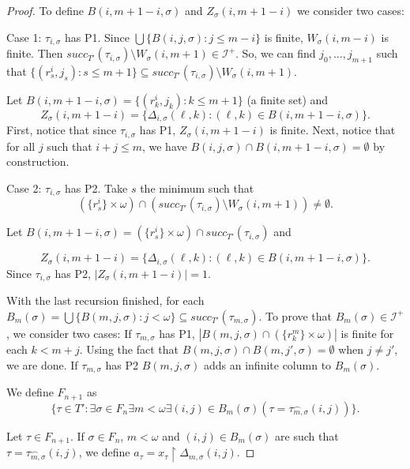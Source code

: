 \documentclass{amsart}
\theoremstyle{definition}
\theoremstyle{remark}
\numberwithin{equation}{section}
\newcommand{\id}{\mathcal{I}}
\newcommand{\restr}[2]{#1\upharpoonright {#2}}
\begin{document}
\begin{proof}
    To define $B(i,m+1-i,\sigma)$ and $ Z_\sigma(i,m+1-i)$ we consider two cases:

    Case 1: $\tau_{i,\sigma}$ has P1. Since $\bigcup\{B(i,j,\sigma):j\leq m-i\}$ is finite, $W_\sigma(i,m-i)$ is finite. Then $succ_{T'}(\tau_{i,\sigma})\setminus W_\sigma(i,m+1)\in\id^+ $. So, we can find $j_0,...,j_{m+1}$ such that $\{(r_s^i,j_s): s\leq m+1\}\subseteq succ_{T'}(\tau_{i,\sigma})\setminus W_\sigma(i,m+1)$. 
    
    Let $B(i,m+1-i,\sigma)=\{(r^i_k,j_k):k\leq m+1\}$ (a finite set) and 
    \[ Z_\sigma(i,m+1-i)=\{ \Delta_{i,\sigma}(\ell,k): (\ell,k)\in B(i,m+1-i,\sigma)\}.
    \]
    First, notice that since $\tau_{i,\sigma}$ has P1, $Z_\sigma(i,m+1-i)$ is finite. Next, notice that for all $j$ such that $i+j\leq m$, we have $B(i,j,\sigma)\cap B(i,m+1-i,\sigma)=\emptyset$ by construction.

    Case 2: $\tau_{i,\sigma}$ has P2. Take $s$ the minimum such that 
    \begin{displaymath}
        (\{r_s^i\}\times \omega)\cap(succ_{T'}(\tau_{i,\sigma})\setminus W_\sigma(i,m+1))\not =\emptyset.
    \end{displaymath}
    
    Let $B(i,m+1-i,\sigma)=(\{r^i_s\}\times \omega)\cap succ_{T'}(\tau_{i,\sigma})$ and
    
    \[Z_\sigma(i,m+1-i)=\{\Delta_{i,\sigma}(\ell,k): (\ell,k)\in B(i,m+1-i,\sigma)\}.\]
    Since $\tau_{i,\sigma}$ has P2, $|Z_\sigma(i,m+1-i)|=1$.

    With the last recursion finished, for each $B_m(\sigma)=\bigcup\{B(m,j,\sigma):j<\omega\}\subseteq succ_{T'}(\tau_{m,\sigma})$. To prove that $B_m(\sigma)\in \id^+$, we consider two cases: If $\tau_{m,\sigma}$ has P1, $|B(m,j,\sigma)\cap (\{r^m_k\}\times \omega)|$ is finite for each $k<m+j$. Using the fact that $B(m,j,\sigma)\cap B(m,j',\sigma)=\emptyset$ when $j\not=j'$, we are done. If $\tau_{m,\sigma}$ has P2 $B(m,j,\sigma)$ adds an infinite column to $B_m(\sigma)$.

    We define $F_{n+1}$ as
    \begin{displaymath}
        \{\tau\in T':\exists \sigma\in F_n \exists m<\omega \exists(i,j)\in B_m(\sigma)( \tau=\tau_{m,\sigma}^{\frown}(i,j))\}.
    \end{displaymath}

    Let $\tau\in F_{n+1}$. If $\sigma\in F_n$, $m<\omega$ and $(i,j)\in B_m(\sigma)$ are such that $\tau=\tau_{m,\sigma}^{\frown}(i,j)$, we define $a_\tau=\restr{x_\tau}{\Delta_{m,\sigma}(i,j)}$.


\end{proof}
\end{document}
